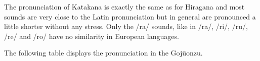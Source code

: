 \bigskip
The pronunciation of Katakana is exactly the same as for Hiragana and most
sounds are very close to the Latin pronunciation but in general are pronounced a
little shorter without any stress. Only the /ra/ sounds, like in /ra/, /ri/, /ru/,
/re/ and /ro/ have no similarity in European languages. 



The following table displays the pronunciation in the Gojūonzu.





